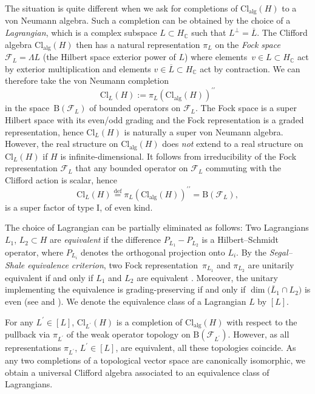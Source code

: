 \documentclass[pdftex]{sigma}
\numberwithin{equation}{section}
\newcommand{\C}{\mathbb{C}}
\newcommand{\B}{\mathrm{B}}
\newcommand{\Cl}{\mathrm{Cl}}
\begin{document}
The situation is quite different when we ask for completions of $\Cl_{\mathrm{alg}}(H)$ to a von Neumann algebra.
Such a completion can be obtained by the choice of a \emph{Lagrangian}, which is a complex subspace $L \subset H_\C$ such that $L^\perp = \overline{L}$.
The Clifford algebra $\Cl_{\mathrm{alg}}(H)$ then has a natural representation $\pi_L$ on the \emph{Fock space} $\mathcal{F}_L = \Lambda L$ (the Hilbert space exterior power of $L$) where elements~$v \in L \subset H_\C$ act by exterior multiplication and elements $v \in \overline{L} \subset H_\C$ act by contraction. We can therefore take the von Neumann completion
\[\Cl_L(H) := \pi_L(\Cl_{\mathrm{alg}}(H))^{\prime\prime}\]
 in the space~$\B(\mathcal{F}_L)$ of bounded operators on $\mathcal{F}_L$.
The Fock space is a super Hilbert space with its even/odd grading and the Fock representation is a graded representation, hence $\Cl_L(H)$ is naturally a super von Neumann algebra.
However, the real structure on $\Cl_{\mathrm{alg}}(H)$ does \emph{not} extend to a real structure on $\Cl_L(H)$ if $H$ is infinite-dimensional. It follows from irreducibility of the Fock representation $\mathcal{F}_L$ \cite[Theorem~2.4.2]{PlymenRobinson} that any bounded operator on $\mathcal{F}_L$ commuting with the Clifford action is scalar, hence
\begin{equation}
\label{IdentificationWithBH}
 \Cl_L(H)  \stackrel{\mathrm{def}}{=}  \pi_L(\Cl_{\mathrm{alg}}(H))^{\prime\prime} = \B(\mathcal{F}_L),
\end{equation}
is a super factor of type I, of even kind.

The choice of Lagrangian can be partially eliminated as follows:
Two Lagrangians $L_1$, $L_2 \subset H$ are \emph{equivalent} if the difference $P_{L_1} - P_{L_2}$ is a Hilbert--Schmidt operator, where $P_{L_i}$ denotes the orthogonal projection onto $L_i$.
By the \emph{Segal--Shale equivalence criterion}, two Fock representation~$\pi_{L_1}$ and $\pi_{L_2}$ are unitarily equivalent if and only if $L_1$ and $L_2$ are equivalent \cite[Theorem~3.4.1]{PlymenRobinson}.
Moreover, the unitary implementing the equivalence is grading-preserving if and only if $\dim\big(\overline{L}_1 \cap L_2\big)$ is even (see \cite[Theorem~1.22]{PratWaldron} and \cite[Theorem~3.5.1]{PlymenRobinson}).
We denote the equivalence class of a Lagrangian $L$ by $[L]$.

For any $L^\prime \in [L]$, $\Cl_{L^\prime}(H)$ is a completion of $\Cl_{\mathrm{alg}}(H)$ with respect to the pullback via $\pi_{L^\prime}$ of the weak operator topology on $\B(\mathcal{F}_{L^\prime})$.
However, as all representations $\pi_{L^\prime}$, $L^\prime \in [L]$, are equivalent, all these topologies coincide. As any two completions of a topological vector space are canonically isomorphic, we obtain a universal Clifford algebra associated to an equivalence class of Lagrangians.
\end{document}
